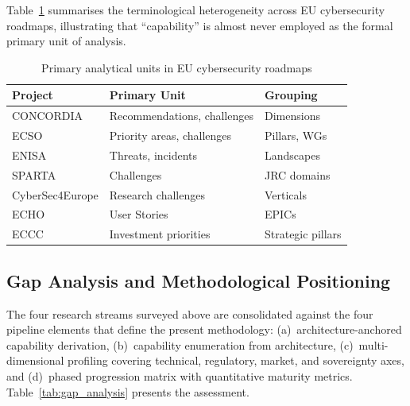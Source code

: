 Table~\ref{tab:eu_terminology} summarises the terminological
heterogeneity across EU cybersecurity roadmaps, illustrating that
``capability'' is almost never employed as the formal primary unit of
analysis.

\begin{table}[!ht]
\centering
\caption{Primary analytical units in EU cybersecurity roadmaps}
\label{tab:eu_terminology}
\footnotesize
\begin{tabular}{p{2.8cm} p{2.5cm} p{2.2cm}}
\toprule
\textbf{Project} & \textbf{Primary Unit} & \textbf{Grouping} \\
\midrule
CONCORDIA & Recommendations, challenges & Dimensions \\
ECSO & Priority areas, challenges & Pillars, WGs \\
ENISA & Threats, incidents & Landscapes \\
SPARTA & Challenges & JRC domains \\
CyberSec4Europe & Research challenges & Verticals \\
ECHO & User Stories & EPICs \\
ECCC & Investment priorities & Strategic pillars \\
\bottomrule
\end{tabular}
\end{table}

\subsection{Gap Analysis and Methodological Positioning}
\label{sec:rw_gap}

The four research streams surveyed above are consolidated against the
four pipeline elements that define the present methodology:
(a)~architecture-anchored capability derivation, (b)~capability
enumeration from architecture, (c)~multi-dimensional profiling covering
technical, regulatory, market, and sovereignty axes, and (d)~phased
progression matrix with quantitative maturity metrics.
Table~\ref{tab:gap_analysis} presents the assessment.

